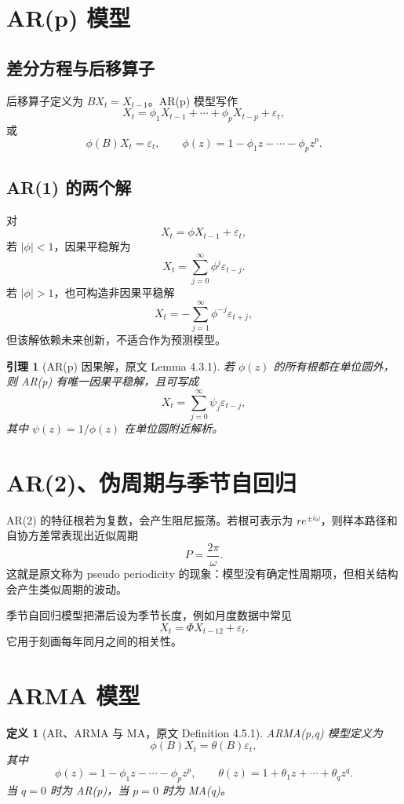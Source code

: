\documentclass[11pt,a4paper]{ctexart}
\newtheorem{definition}{定义}[section]
\newtheorem{lemma}{引理}[section]
\begin{document}
\section{AR(p) 模型}

\subsection{差分方程与后移算子}

后移算子定义为 \(BX_t=X_{t-1}\)。AR(p) 模型写作
\[
  X_t=\phi_1X_{t-1}+\cdots+\phi_pX_{t-p}+\varepsilon_t,
\]
或
\[
  \phi(B)X_t=\varepsilon_t,\qquad
  \phi(z)=1-\phi_1z-\cdots-\phi_pz^p.
\]

\subsection{AR(1) 的两个解}

对
\[
  X_t=\phi X_{t-1}+\varepsilon_t,
\]
若 \(|\phi|<1\)，因果平稳解为
\[
  X_t=\sum_{j=0}^{\infty}\phi^j\varepsilon_{t-j}.
\]
若 \(|\phi|>1\)，也可构造非因果平稳解
\[
  X_t=-\sum_{j=1}^{\infty}\phi^{-j}\varepsilon_{t+j},
\]
但该解依赖未来创新，不适合作为预测模型。

\begin{lemma}[AR(p) 因果解，原文 Lemma 4.3.1]
若 \(\phi(z)\) 的所有根都在单位圆外，则 AR(p) 有唯一因果平稳解，且可写成
\[
  X_t=\sum_{j=0}^{\infty}\psi_j\varepsilon_{t-j},
\]
其中 \(\psi(z)=1/\phi(z)\) 在单位圆附近解析。
\end{lemma}

\section{AR(2)、伪周期与季节自回归}

AR(2) 的特征根若为复数，会产生阻尼振荡。若根可表示为 \(re^{\pm i\omega}\)，则样本路径和自协方差常表现出近似周期
\[
  P=\frac{2\pi}{\omega}.
\]
这就是原文称为 pseudo periodicity 的现象：模型没有确定性周期项，但相关结构会产生类似周期的波动。

季节自回归模型把滞后设为季节长度，例如月度数据中常见
\[
  X_t=\Phi X_{t-12}+\varepsilon_t.
\]
它用于刻画每年同月之间的相关性。

\section{ARMA 模型}

\begin{definition}[AR、ARMA 与 MA，原文 Definition 4.5.1]
ARMA(p,q) 模型定义为
\[
  \phi(B)X_t=\theta(B)\varepsilon_t,
\]
其中
\[
  \phi(z)=1-\phi_1z-\cdots-\phi_pz^p,\qquad
  \theta(z)=1+\theta_1z+\cdots+\theta_qz^q.
\]
当 \(q=0\) 时为 AR(p)，当 \(p=0\) 时为 MA(q)。
\end{definition}
\end{document}
